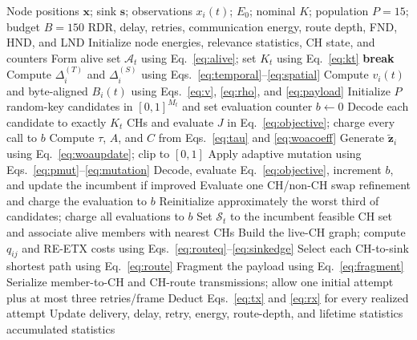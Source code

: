 \documentclass[pdflatex,sn-mathphys-num]{sn-jnl}
\begin{document}
\begin{algorithm}[H]
\caption{Integrated AD-CWOA--relevance--RE-ETX procedure.}
\label{alg:integrated}
\footnotesize
\begin{algorithmic}[1]
\Require Node positions $\mathbf{x}$; sink $\mathbf{s}$; observations $x_i(t)$; $E_0$; nominal $K$; population $P=15$; budget $B=150$
\Ensure RDR, delay, retries, communication energy, route depth, FND, HND, and LND
\State Initialize node energies, relevance statistics, CH state, and counters
    \State Form alive set $\mathcal{A}_t$ using Eq.~\eqref{eq:alive}; set $K_t$ using Eq.~\eqref{eq:kt}
     \State \textbf{break} \EndIf
    \State Compute $\Delta_i^{(T)}$ and $\Delta_i^{(S)}$ using Eqs.~\eqref{eq:temporal}--\eqref{eq:spatial}
    \State Compute $v_i(t)$ and byte-aligned $B_i(t)$ using Eqs.~\eqref{eq:v}, \eqref{eq:rho}, and \eqref{eq:payload}
        \State Initialize $P$ random-key candidates in $[0,1]^{M_t}$ and set evaluation counter $b\gets0$
        \State Decode each candidate to exactly $K_t$ CHs and evaluate $J$ in Eq.~\eqref{eq:objective}; charge every call to $b$
            \State Compute $\tau$, $A$, and $C$ from Eqs.~\eqref{eq:tau} and \eqref{eq:woacoeff}
                \State Generate $\widetilde{\mathbf{z}}_i$ using Eq.~\eqref{eq:woaupdate}; clip to $[0,1]$
                \State Apply adaptive mutation using Eqs.~\eqref{eq:pmut}--\eqref{eq:mutation}
                \State Decode, evaluate Eq.~\eqref{eq:objective}, increment $b$, and update the incumbent if improved
                    \State Evaluate one CH/non-CH swap refinement and charge the evaluation to $b$
                \EndIf
            \EndFor
                \State Reinitialize approximately the worst third of candidates; charge all evaluations to $b$
            \EndIf
        \EndWhile
        \State Set $\mathcal{S}_t$ to the incumbent feasible CH set and associate alive members with nearest CHs
    \EndIf
    \State Build the live-CH graph; compute $q_{ij}$ and RE-ETX costs using Eqs.~\eqref{eq:routeq}--\eqref{eq:sinkedge}
    \State Select each CH-to-sink shortest path using Eq.~\eqref{eq:route}
        \State Fragment the payload using Eq.~\eqref{eq:fragment}
        \State Serialize member-to-CH and CH-route transmissions; allow one initial attempt plus at most three retries/frame
        \State Deduct Eqs.~\eqref{eq:tx} and \eqref{eq:rx} for every realized attempt
    \EndFor
    \State Update delivery, delay, retry, energy, route-depth, and lifetime statistics
\EndFor
\State \Return accumulated statistics
\end{algorithmic}
\end{algorithm}
\end{document}

